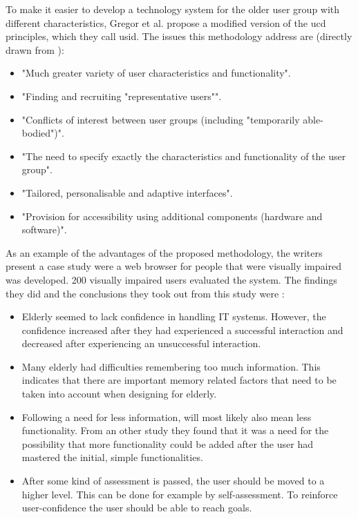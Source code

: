 To make it easier to develop a technology system for the older user group with different characteristics, Gregor et al. propose a modified version of the \ac{ucd} principles, which they call \ac{usid}. The issues this methodology address are (directly drawn from \cite{gregor}): 
\begin{itemize}
\item "Much greater variety of user characteristics and functionality". 
\item "Finding and recruiting "representative users"". 
\item "Conflicts of interest between user groups (including "temporarily able-bodied")".
\item "The need to specify exactly the characteristics and functionality of the user group".
\item "Tailored, personalisable and adaptive interfaces".
\item "Provision for accessibility using additional components (hardware and software)".
\end{itemize}

As an example of the advantages of the proposed methodology, the writers present a case study were a web browser for people that were visually impaired was developed. 200 visually impaired users evaluated the system. The findings they did and the conclusions they took out from this study were \cite{gregor}: 
\begin{itemize}
\item Elderly seemed to lack confidence in handling IT systems. However, the confidence increased after they had experienced a successful interaction and decreased after experiencing an unsuccessful interaction.
\item Many elderly had difficulties remembering too much information. This indicates that there are important memory related factors that need to be taken into account when designing for elderly. 
\item Following a need for less information, will most likely also mean less functionality. From an other study they found that it was a need for the possibility that more functionality could be added after the user had mastered the initial, simple functionalities.
\item After some kind of assessment is passed, the user should be moved to a higher level. This can be done for example by self-assessment. To reinforce user-confidence the user should be able to reach goals. 
\end{itemize}

